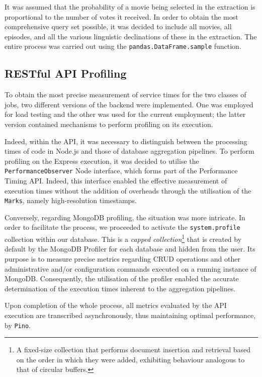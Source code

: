 It was assumed that the probability of a movie being selected in the extraction is proportional to the number of votes it received.
In order to obtain the most comprehensive query set possible, it was decided to include all movies, all episodes, and all the various linguistic declinations of these in the extraction.
The entire process was carried out using the \verb|pandas.DataFrame.sample| function.

\subsection{RESTful API Profiling}

To obtain the most precise measurement of service times for the two classes of jobs, two different versions of the backend were implemented.
One was employed for load testing and the other was used for the current employment; the latter version contained mechanisms to perform profiling on its execution.

Indeed, within the API, it was necessary to distinguish between the processing times of code in Node.js and those of database aggregation pipelines.
To perform profiling on the Express execution, it was decided to utilise the \verb|PerformanceObserver| Node interface, which forms part of the Performance Timing API.
Indeed, this interface enabled the effective measurement of execution times without the addition of overheads through the utilisation of the \verb|Marks|, namely high-resolution timestamps.

Conversely, regarding MongoDB profiling, the situation was more intricate.
In order to facilitate the process, we proceeded to activate the \verb|system.profile| collection within our database. 
This is a \textit{capped collection}\footnote[1]{A fixed-size collection that performs document insertion and retrieval based on the order in which they were added, exhibiting behaviour analogous to that of circular buffers.} that is created by default by the MongoDB Profiler for each database and hidden from the user.
Its purpose is to measure precise metrics regarding CRUD operations and other administrative and/or configuration commands executed on a running instance of MongoDB.
Consequently, the utilisation of the profiler enabled the accurate determination of the execution times inherent to the aggregation pipelines.

Upon completion of the whole process, all metrics evaluated by the API execution are transcribed asynchronously, thus maintaining optimal performance, by \verb|Pino|.

